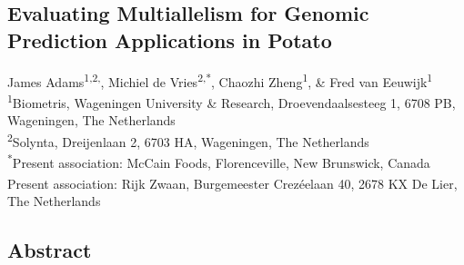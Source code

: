 \begin{refsection}
\chapter[Evaluating Multiallelism for Genomic Prediction Applications in
Potato]{Evaluating Multiallelism for Genomic Prediction Applications in
Potato}
\label{cha:chapter5}

\begin{center}
James Adams\textsuperscript{1,2,\textdagger},
Michiel de Vries\textsuperscript{2,*},
Chaozhi Zheng\textsuperscript{1}, \&
Fred van Eeuwijk\textsuperscript{1}\\[0.5em]
\small
\textsuperscript{1}Biometris, Wageningen University \& Research, Droevendaalsesteeg 1, 6708 PB, Wageningen, The Netherlands\\
\textsuperscript{2}Solynta, Dreijenlaan 2, 6703 HA, Wageningen, The Netherlands\\
\textsuperscript{*}Present association: McCain Foods, Florenceville, New Brunswick, Canada\\
\textsuperscript{\textdagger } Present association: Rijk Zwaan, Burgemeester Crezéelaan 40, 2678 KX De Lier, The Netherlands\\
\end{center}
\vspace{0.5em}

\vspace*{\fill}

\newpage

\section*{Abstract}


\end{refsection}
